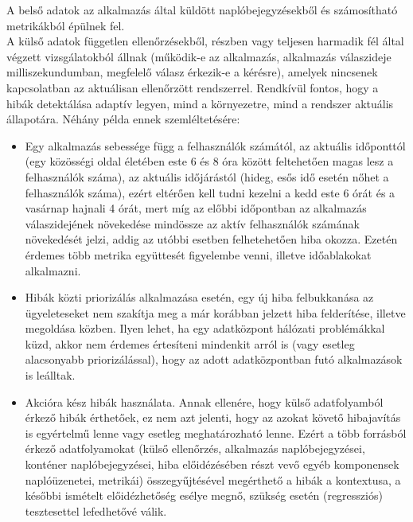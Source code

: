 A belső adatok az alkalmazás által küldött naplóbejegyzésekből és számosítható metrikákból épülnek fel.\\
A külső adatok független ellenőrzésekből, részben vagy teljesen harmadik fél által végzett vizsgálatokból állnak (működik-e az alkalmazás, alkalmazás válaszideje milliszekundumban, megfelelő válasz érkezik-e a kérésre), amelyek nincsenek kapcsolatban az aktuálisan ellenőrzött rendszerrel. Rendkívül fontos, hogy a hibák detektálása adaptív legyen, mind a környezetre, mind a rendszer aktuális állapotára. Néhány példa ennek szemléltetésére:

\begin{itemize}
  \item Egy alkalmazás sebessége függ a felhasználók számától, az aktuális időponttól (egy közösségi oldal életében este 6 és 8 óra között feltehetően magas lesz a felhasználók száma), az aktuális időjárástól (hideg, esős idő esetén nőhet a felhasználók száma), ezért eltérően kell tudni kezelni a kedd este 6 órát és a vasárnap hajnali 4 órát, mert míg az előbbi időpontban az alkalmazás válaszidejének növekedése mindössze az aktív felhasználók számának növekedését jelzi, addig az utóbbi esetben felhetehetően hiba okozza. Ezetén érdemes több metrika együttesét figyelembe venni, illetve időablakokat alkalmazni.
  \item Hibák közti priorizálás alkalmazása esetén, egy új hiba felbukkanása az ügyeleteseket nem szakítja meg a már korábban jelzett hiba felderítése, illetve megoldása közben. Ilyen lehet, ha egy adatközpont hálózati problémákkal küzd, akkor nem érdemes értesíteni mindenkit arról is (vagy esetleg alacsonyabb priorizálással), hogy az adott adatközpontban futó alkalmazások is leálltak.
  \item Akcióra kész hibák használata. Annak ellenére, hogy külső adatfolyamból érkező hibák érthetőek, ez nem azt jelenti, hogy az azokat követő hibajavítás is egyértelmű lenne vagy esetleg meghatározható lenne. Ezért a több forrásból érkező adatfolyamokat (külső ellenőrzés, alkalmazás naplóbejegyzései, konténer naplóbejegyzései, hiba előidézésében részt vevő egyéb komponensek naplóüzenetei, metrikái) összegyűjtésével megérthető a hibák a kontextusa, a későbbi ismételt előidézhetőség esélye megnő, szükség esetén (regressziós) tesztesettel lefedhetővé válik.
\end{itemize}

